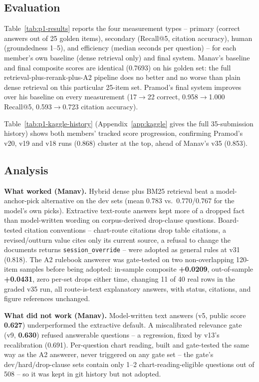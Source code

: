 \documentclass[conference,10pt]{IEEEtran}
\begin{document}
\subsection{Evaluation}



Table~\ref{tab:p1-results} reports the four measurement types -- primary (correct answers out of 25
golden items), secondary (Recall@5, citation accuracy), human (groundedness 1--5), and efficiency
(median seconds per question) -- for each member's own baseline (dense retrieval only) and final
system. Manav's baseline and final composite scores are identical (0.7693) on his golden set: the
full retrieval-plus-rerank-plus-A2 pipeline does no better and no worse than plain dense retrieval on
this particular 25-item set. Pramod's final system improves over his baseline on every measurement
(17$\to$22 correct, 0.958$\to$1.000 Recall@5, 0.593$\to$0.723 citation accuracy).



Table~\ref{tab:p1-kaggle-history} (Appendix~\ref{app:kaggle} gives the full 35-submission history)
shows both members' tracked score progression, confirming Pramod's v20, v19 and v18 runs (0.868)
cluster at the top, ahead of Manav's v35 (0.853).

\subsection{Analysis}

\textbf{What worked (Manav).} Hybrid dense plus BM25 retrieval beat a model-anchor-pick alternative
on the dev sets (mean 0.783 vs.\ 0.770/0.767 for the model's own picks). Extractive text-route
answers kept more of a dropped fact than model-written wording on corpus-derived drop-clause
questions. Board-tested citation conventions -- chart-route citations drop table citations, a
revised/outturn value cites only its current source, a refusal to change the documents returns
\texttt{session\_override} -- were adopted as general rules at v31 (0.818). The A2 rulebook answerer
was gate-tested on two non-overlapping 120-item samples before being adopted: in-sample composite
\textbf{+0.0209}, out-of-sample \textbf{+0.0431}, zero per-set drops either time, changing 11 of 40
real rows in the graded v35 run, all route-is-text explanatory answers, with status, citations, and
figure references unchanged.

\textbf{What did not work (Manav).} Model-written text answers (v5, public score \textbf{0.627})
underperformed the extractive default. A miscalibrated relevance gate (v9, \textbf{0.630}) refused
answerable questions -- a regression, fixed by v13's recalibration (0.691). Per-question chart
reading, built and gate-tested the same way as the A2 answerer, never triggered on any gate set --
the gate's dev/hard/drop-clause sets contain only 1--2 chart-reading-eligible questions out of 508 --
so it was kept in git history but not adopted.
\end{document}
